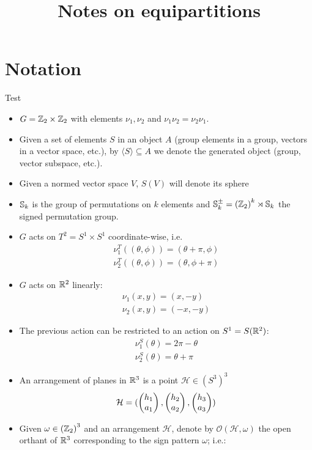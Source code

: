 \documentclass[10pt]{article}
\title{Notes on equipartitions}
\author{}
\begin{document}
\maketitle
\graphicspath{{./figs/}}

\section{Notation}
Test
\begin{itemize}
\item $G=\mathbb{Z}_2\times\mathbb{Z}_2$ with elements $\nu_1, \nu_2$ and $\nu_1\nu_2 = \nu_2\nu_1$.
  \item Given a set of elements $S$ in an object $A$ (group elements in a group, vectors in a vector space, etc.), by $\langle S\rangle\subseteq A$ we denote the generated object (group, vector subspace, etc.).
  \item Given a normed vector space $V$, $S(V)$ will denote its sphere
  \item $\mathbb{S}_k$ is the group of permutations on $k$ elements and $\mathbb{S}_k^{\pm} = \left( \mathbb{Z}_2 \right)^k \rtimes \mathbb{S}_k$ the signed permutation group.
  \item $G$ acts on $T^2 = S^1\times S^1$ coordinate-wise, i.e.
    \begin{align*}
      \nu_1^T((\theta, \phi)) = (\theta + \pi, \phi) \\
      \nu_2^T((\theta, \phi)) = (\theta, \phi + \pi)
    \end{align*}
  \item $G$ acts on $\mathbb{R}^2$ linearly:
    \begin{align*}
      \nu_1(x,y) = (x, -y)\\
      \nu_2(x,y) = (-x, -y)
    \end{align*}
  \item The previous action can be restricted to an action on $S^1=S(\mathbb{R}^2)$:
    \begin{align*}
      \nu_1^S(\theta) = 2\pi - \theta \\
      \nu_2^S(\theta) = \theta + \pi
    \end{align*}
  \item An arrangement of planes in $\mathbb{R}^3$ is a point $\mathcal{H} \in \left(S^3\right)^3$
    \[
      \mathcal{H}=(\begin{pmatrix}h_1\\a_1\end{pmatrix},\begin{pmatrix}h_2\\a_2\end{pmatrix}, \begin{pmatrix}h_3\\a_3\end{pmatrix})
    \]
  \item Given $\omega \in \left(\mathbb{Z}_2\right)^3$ and an arrangement $\mathcal{H}$, denote by $\mathcal{O}(\mathcal{H}, \omega)$ the open orthant of $\mathbb{R}^3$ corresponding to the sign pattern $\omega$; i.e.:

\end{itemize}
\end{document}
